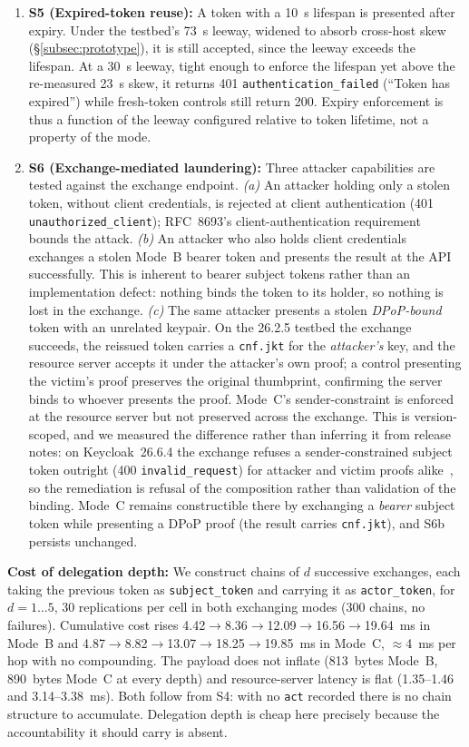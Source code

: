 \documentclass[conference]{IEEEtran}
\begin{document}
\begin{enumerate}
\item \textbf{S5 (Expired-token reuse):} A token with a 10~s lifespan is presented after expiry. Under the testbed's 73~s leeway, widened to absorb cross-host skew (\S\ref{subsec:prototype}), it is still accepted, since the leeway exceeds the lifespan. At a 30~s leeway, tight enough to enforce the lifespan yet above the re-measured 23~s skew, it returns 401 \texttt{authentication\_failed} (``Token has expired'') while fresh-token controls still return 200. Expiry enforcement is thus a function of the leeway configured relative to token lifetime, not a property of the mode.

\item \textbf{S6 (Exchange-mediated laundering):} Three attacker capabilities are tested against the exchange endpoint. \emph{(a)} An attacker holding only a stolen token, without client credentials, is rejected at client authentication (401 \texttt{unauthorized\_client}); RFC~8693's client-authentication requirement bounds the attack. \emph{(b)} An attacker who also holds client credentials exchanges a stolen Mode~B bearer token and presents the result at the API successfully. This is inherent to bearer subject tokens rather than an implementation defect: nothing binds the token to its holder, so nothing is lost in the exchange. \emph{(c)} The same attacker presents a stolen \emph{DPoP-bound} token with an unrelated keypair. On the 26.2.5 testbed the exchange succeeds, the reissued token carries a \texttt{cnf.jkt} for the \emph{attacker's} key, and the resource server accepts it under the attacker's own proof; a control presenting the victim's proof preserves the original thumbprint, confirming the server binds to whoever presents the proof. Mode~C's sender-constraint is enforced at the resource server but not preserved across the exchange. This is version-scoped, and we measured the difference rather than inferring it from release notes: on Keycloak~26.6.4 the exchange refuses a sender-constrained subject token outright (400 \texttt{invalid\_request}) for attacker and victim proofs alike~\cite{keycloak2026rel266}, so the remediation is refusal of the composition rather than validation of the binding. Mode~C remains constructible there by exchanging a \emph{bearer} subject token while presenting a DPoP proof (the result carries \texttt{cnf.jkt}), and S6b persists unchanged.
\end{enumerate}

\textbf{Cost of delegation depth:}
We construct chains of $d$ successive exchanges, each taking the previous token as \texttt{subject\_token} and carrying it as \texttt{actor\_token}, for $d = 1 \ldots 5$, 30 replications per cell in both exchanging modes (300 chains, no failures). Cumulative cost rises 4.42$\to$8.36$\to$12.09$\to$16.56$\to$19.64~ms in Mode~B and 4.87$\to$8.82$\to$13.07$\to$18.25$\to$19.85~ms in Mode~C, $\approx$4~ms per hop with no compounding. The payload does not inflate (813~bytes Mode~B, 890~bytes Mode~C at every depth) and resource-server latency is flat (1.35--1.46 and 3.14--3.38~ms). Both follow from S4: with no \texttt{act} recorded there is no chain structure to accumulate. Delegation depth is cheap here precisely because the accountability it should carry is absent.
\end{document}
